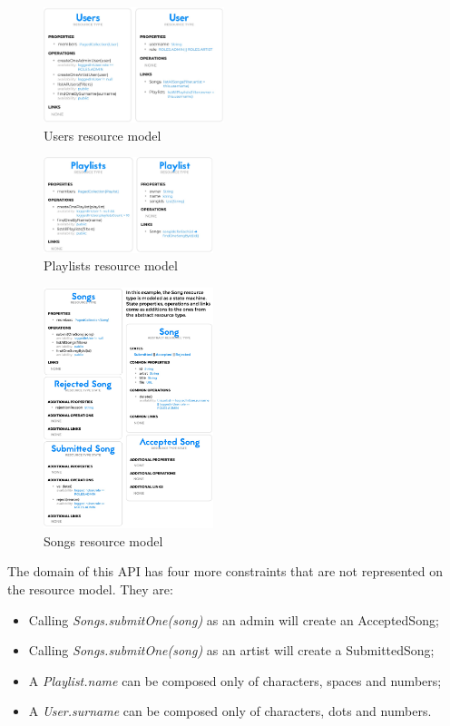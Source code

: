 \begin{figure}[ht]
\caption{Users resource model}
\centering
\includegraphics[width=0.47\textwidth]{figures/users.jpg}
\end{figure}

\begin{figure}[ht]
\caption{Playlists resource model}
\centering
\includegraphics[width=0.44\textwidth]{figures/playlists.jpg}
\end{figure}

\begin{figure}[ht]
\caption{Songs resource model}
\includegraphics[width=0.44\textwidth]{figures/songs.jpg}
\end{figure}

The domain of this API has four more constraints that are not represented on the resource model. They are:

\begin{itemize}
    \item Calling \textit{Songs.submitOne(song)} as an admin will create an AcceptedSong;
    \item Calling \textit{Songs.submitOne(song)} as an artist will create a SubmittedSong;
    \item A \textit{Playlist.name} can be composed only of characters, spaces and numbers;
    \item A \textit{User.surname} can be composed only of characters, dots and numbers.
\end{itemize}

